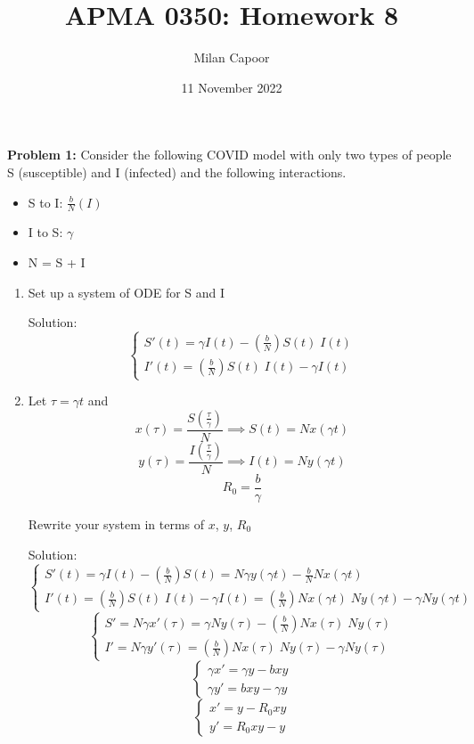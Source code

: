 \documentclass[12pt]{article}
\title{APMA 0350: Homework 8}
\author{Milan Capoor}
\date{11 November 2022}
\begin{document}
\maketitle

\textbf{Problem 1:} Consider the following COVID model with only two types of people S (susceptible) and I (infected) and the following interactions.
\begin{itemize}
    \item S to I: $\frac{b}{N}(I)$
    \item I to S: $\gamma$
    \item N = S + I
\end{itemize}

\begin{enumerate}
    \item Set up a system of ODE for S and I
    
    Solution:
    \[\boxed{\begin{cases}
        S'(t) = \gamma I(t) -\left(\frac{b}{N}\right) S(t)\; I(t) \\
        I'(t) = \left(\frac{b}{N}\right) S(t)\; I(t) - \gamma I(t)
    \end{cases}}\]

    \item Let $\tau = \gamma t$ and 
    \[x(\tau) = \frac{S(\frac{\tau}{\gamma})}{N} \implies S(t) = N x(\gamma t)\]
    \[y(\tau) = \frac{I(\frac{\tau}{\gamma})}{N} \implies I(t) = N y(\gamma t)\]
    \[R_0 = \frac{b}{\gamma}\]

    Rewrite your system in terms of $x$, $y$, $R_0$

    Solution:
    \[\begin{cases}
        S'(t) = \gamma I(t) -\left(\frac{b}{N}\right) S(t) = N \gamma y(\gamma t) - \frac{b}{N} N x(\gamma t) \\
        I'(t) = \left(\frac{b}{N}\right) S(t)\; I(t) - \gamma I(t) = \left(\frac{b}{N}\right) N x(\gamma t)\; N y (\gamma t) - \gamma N y(\gamma t)
    \end{cases}\]
    \[\begin{cases}
        S' = N\gamma x'(\tau) = \gamma Ny(\tau) -\left(\frac{b}{N}\right) Nx(\tau)\; Ny(\tau) \\
        I' = N\gamma y'(\tau) = \left(\frac{b}{N}\right) Nx(\tau)\; Ny(\tau) - \gamma Ny(\tau)
    \end{cases}\]
    \[\begin{cases}
        \gamma x' = \gamma y - bxy\\
        \gamma y' = bxy - \gamma y
    \end{cases}\]
    \[\boxed{\begin{cases}
        x' = y - R_0 xy\\
        y' = R_0 xy - y
    \end{cases}}\]


\end{enumerate}
\end{document}
